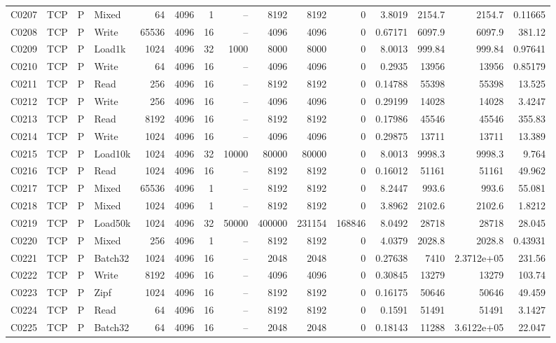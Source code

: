 \begin{landscape}
\begin{longtable}{llllrrrrrrrrrrr}
C0207 & TCP & P & Mixed & 64 & 4096 & 1 & -- & 8192 & 8192 & 0 & 3.8019 & 2154.7 & 2154.7 & 0.11665\\
C0208 & TCP & P & Write & 65536 & 4096 & 16 & -- & 4096 & 4096 & 0 & 0.67171 & 6097.9 & 6097.9 & 381.12\\
C0209 & TCP & P & Load1k & 1024 & 4096 & 32 & 1000 & 8000 & 8000 & 0 & 8.0013 & 999.84 & 999.84 & 0.97641\\
C0210 & TCP & P & Write & 64 & 4096 & 16 & -- & 4096 & 4096 & 0 & 0.2935 & 13956 & 13956 & 0.85179\\
C0211 & TCP & P & Read & 256 & 4096 & 16 & -- & 8192 & 8192 & 0 & 0.14788 & 55398 & 55398 & 13.525\\
C0212 & TCP & P & Write & 256 & 4096 & 16 & -- & 4096 & 4096 & 0 & 0.29199 & 14028 & 14028 & 3.4247\\
C0213 & TCP & P & Read & 8192 & 4096 & 16 & -- & 8192 & 8192 & 0 & 0.17986 & 45546 & 45546 & 355.83\\
C0214 & TCP & P & Write & 1024 & 4096 & 16 & -- & 4096 & 4096 & 0 & 0.29875 & 13711 & 13711 & 13.389\\
C0215 & TCP & P & Load10k & 1024 & 4096 & 32 & 10000 & 80000 & 80000 & 0 & 8.0013 & 9998.3 & 9998.3 & 9.764\\
C0216 & TCP & P & Read & 1024 & 4096 & 16 & -- & 8192 & 8192 & 0 & 0.16012 & 51161 & 51161 & 49.962\\
C0217 & TCP & P & Mixed & 65536 & 4096 & 1 & -- & 8192 & 8192 & 0 & 8.2447 & 993.6 & 993.6 & 55.081\\
C0218 & TCP & P & Mixed & 1024 & 4096 & 1 & -- & 8192 & 8192 & 0 & 3.8962 & 2102.6 & 2102.6 & 1.8212\\
C0219 & TCP & P & Load50k & 1024 & 4096 & 32 & 50000 & 400000 & 231154 & 168846 & 8.0492 & 28718 & 28718 & 28.045\\
C0220 & TCP & P & Mixed & 256 & 4096 & 1 & -- & 8192 & 8192 & 0 & 4.0379 & 2028.8 & 2028.8 & 0.43931\\
C0221 & TCP & P & Batch32 & 1024 & 4096 & 16 & -- & 2048 & 2048 & 0 & 0.27638 & 7410 & 2.3712e+05 & 231.56\\
C0222 & TCP & P & Write & 8192 & 4096 & 16 & -- & 4096 & 4096 & 0 & 0.30845 & 13279 & 13279 & 103.74\\
C0223 & TCP & P & Zipf & 1024 & 4096 & 16 & -- & 8192 & 8192 & 0 & 0.16175 & 50646 & 50646 & 49.459\\
C0224 & TCP & P & Read & 64 & 4096 & 16 & -- & 8192 & 8192 & 0 & 0.1591 & 51491 & 51491 & 3.1427\\
C0225 & TCP & P & Batch32 & 64 & 4096 & 16 & -- & 2048 & 2048 & 0 & 0.18143 & 11288 & 3.6122e+05 & 22.047\\

\end{longtable}
\end{landscape}
